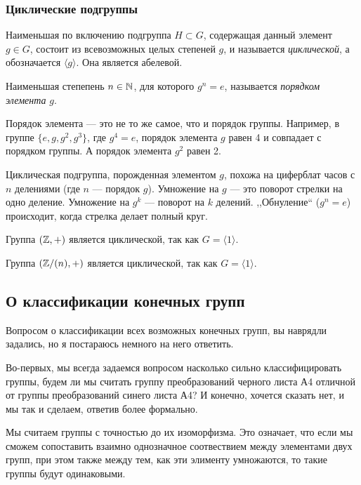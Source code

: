 \subsubsection{Циклические подгруппы}
\begin{definition}
    Наименьшая по включению подгруппа $H\subset G$, содержащая данный элемент $g \in G$, состоит из всевозможных целых степеней $g$, и называется \emph{циклической}, а обозначается $\langle g \rangle$. Она является абелевой.
    
    Наименьшая степепень $n \in \mathbb N$, для которого $g^n = e$, называется \emph{порядком элемента} $g$. 
\end{definition}
\begin{remark}
    Порядок элемента --- это не то же самое, что и порядок группы. Например, в группе $\{e, g, g^2, g^3\}$, где $g^4=e$, порядок элемента $g$ равен 4 и совпадает с порядком группы. А порядок элемента $g^2$ равен 2.
\end{remark}

Циклическая подгруппа, порожденная элементом $g$, похожа на циферблат часов с $n$ делениями (где $n$ --- порядок $g$). Умножение на $g$ --- это поворот стрелки на одно деление. Умножение на $g^k$ --- поворот на $k$ делений. ,,Обнуление`` ($g^n = e$) происходит, когда стрелка делает полный круг.

\begin{example}
    Группа $(\mathbb Z, +)$ является циклической, так как $G = \langle 1 \rangle$.
\end{example}
\begin{example}
    Группа $(\mathbb Z/{(n)}, +)$ является циклической, так как $G = \langle 1 \rangle$.
\end{example}

\subsection{О классификации конечных групп}
Вопросом о классификации всех возможных конечных групп, вы наврядли задались, но я постараюсь немного на него ответить. 

Во-первых, мы всегда задаемся вопросом насколько сильно классифицировать группы, будем ли мы считать группу преобразований черного листа А4 отличной от группы преобразований синего листа А4? И конечно, хочется сказать нет, и мы так и сделаем, ответив более формально.

Мы считаем группы с точностью до их изоморфизма. Это означает, что если мы сможем сопоставить взаимно однозначное соотвествием между элементами двух групп, при этом также между тем, как эти элименту умножаются, то такие группы будут одинаковыми.

